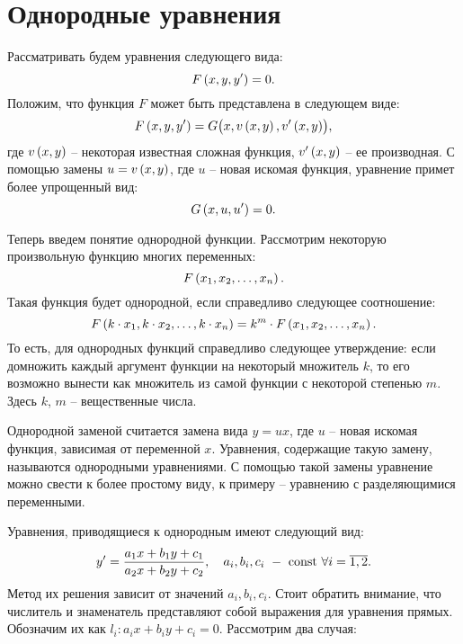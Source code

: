 \section{Однородные уравнения}
	
	Рассматривать будем уравнения следующего вида:
	\[ F \left( x, y, y' \right) = 0. \]
	Положим, что функция $F$ может быть представлена в следующем виде:
	\[ F \left( x, y, y' \right) = G \bigl( x, v\left( x, y \right), v'\left( x, y \right) \bigr), \]
	где $v \left( x, y \right)$ -- некоторая известная сложная функция, $v' \left( x, y \right)$ -- ее производная. С помощью замены $u = v \left( x, y \right)$, где $u$ -- новая искомая функция, уравнение примет более упрощенный вид:
	\[ G \left( x, u, u' \right) = 0. \]

	Теперь введем понятие однородной функции. Рассмотрим некоторую произвольную функцию многих переменных:
	\[ F\left( x_1, x_2, \dots, x_n \right). \]
	Такая функция будет однородной, если справедливо следующее соотношение:
	\[ F\left( k \cdot x_1, k \cdot x_2, \dots, k \cdot x_n \right) = k^m \cdot F\left( x_1, x_2, \dots, x_n \right). \]
	То есть, для однородных функций справедливо следующее утверждение: если домножить каждый аргумент функции на некоторый множитель $k$, то его возможно вынести как множитель из самой функции с некоторой степенью $m$. Здесь $k$, $m$ -- вещественные числа.

	Однородной заменой считается замена вида $y = ux$, где $u$ -- новая искомая функция, зависимая от переменной $x$. Уравнения, содержащие такую замену, называются однородными уравнениями. С помощью такой замены уравнение можно свести к более простому виду, к примеру -- уравнению с разделяющимися переменными.

	Уравнения, приводящиеся к однородным имеют следующий вид:
	\[ y' = \frac{a_1 x + b_1 y + c_1}{a_2 x + b_2 y + c_2}, \quad a_i, b_i, c_i ~ - ~ \mathrm{const} ~ \forall i = \overline{1, 2}. \]
	Метод их решения зависит от значений $a_i, b_i, c_i$. Стоит обратить внимание, что числитель и знаменатель представляют собой выражения для уравнения прямых. Обозначим их как $l_i: a_i x + b_i y + c_i = 0$. Рассмотрим два случая:

